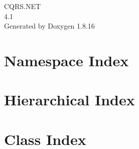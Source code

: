 \let\mypdfximage\pdfximage\def\pdfximage{\immediate\mypdfximage}\documentclass[twoside]{book}
\newcommand{\+}{\discretionary{\mbox{\scriptsize$\hookleftarrow$}}{}{}}
\newcommand{\clearemptydoublepage}{%
  \newpage{\pagestyle{empty}\cleardoublepage}%
}
\begin{document}
\hypersetup{pageanchor=false,
             bookmarksnumbered=true,
             pdfencoding=unicode
            }
\begin{titlepage}
\vspace*{7cm}
\begin{center}%
{\Large C\+Q\+R\+S.\+N\+ET \\[1ex]\large 4.\+1 }\\
\vspace*{1cm}
{\large Generated by Doxygen 1.8.16}\\
\end{center}
\end{titlepage}
\clearemptydoublepage
{}
\tableofcontents
\clearemptydoublepage
{}
\hypersetup{pageanchor=true}

\chapter{Namespace Index}

\chapter{Hierarchical Index}

\chapter{Class Index}

\end{document}
